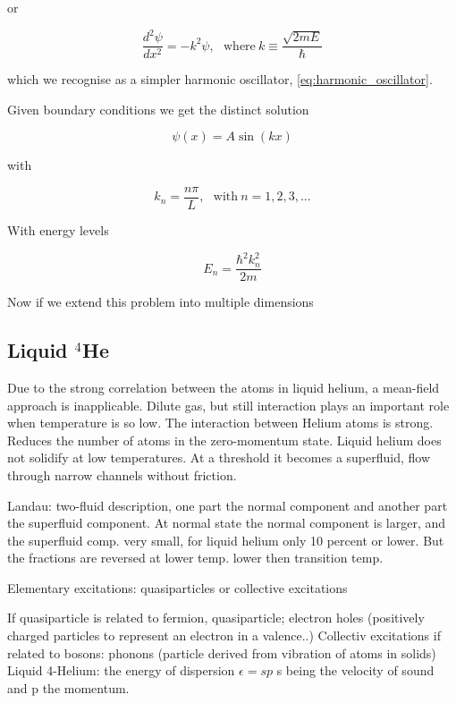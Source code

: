 or 

\begin{equation}
\frac{d^2 \psi}{dx^2} = -k^2 \psi, \ \ \ \text{where}\ k \equiv \frac{\sqrt{2mE}}{\hbar}
\end{equation}

which we recognise as a simpler harmonic oscillator, \eqref{eq:harmonic_oscillator}.

Given boundary conditions we get the distinct solution 

\begin{equation}
\psi(x) = A \sin(kx)
\end{equation}

with 

\begin{equation}
k_n = \frac{n\pi}{L}, \ \ \ \text{with}\ n = 1, 2, 3, ...
\end{equation}

With energy levels

\begin{equation}
E_n = \frac{\hbar^2 k_n^2}{2m}
\end{equation}

Now if we extend this problem into multiple dimensions


\subsection{Liquid $^4$He}
Due to the strong correlation between the atoms in liquid helium, a mean-field approach is inapplicable. Dilute gas, but still interaction plays an important role when temperature is so low. 
The interaction between Helium atoms is strong. Reduces the number of atoms in the zero-momentum state. 
Liquid helium does not solidify at low temperatures. At a threshold it becomes a superfluid, flow through narrow channels without friction. 

Landau: two-fluid description, one part the normal component and another part the superfluid component. 
At normal state the normal component is larger, and the superfluid comp. very small, for liquid helium only 10 percent or lower.
But the fractions are reversed at lower temp. lower then transition temp. 

Elementary excitations: quasiparticles or collective excitations

If quasiparticle is related to fermion, quasiparticle; electron holes (positively charged particles to represent an electron in a valence..)
Collectiv excitations if related to bosons: phonons (particle derived from vibration of atoms in solids) 
Liquid 4-Helium: the energy of dispersion $\epsilon = sp$ s being the velocity of sound and p the momentum.

